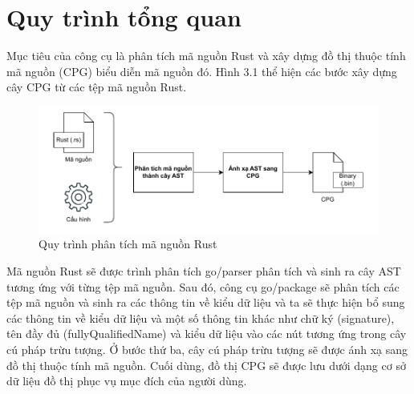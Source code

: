 \section{Quy trình tổng quan}

Mục tiêu của công cụ là phân tích mã nguồn Rust và xây dựng đồ thị thuộc tính mã
nguồn (CPG) biểu diễn mã nguồn đó. Hình 3.1 thể hiện các bước xây dựng cây CPG từ
các tệp mã nguồn Rust.

\begin{figure}[H]
	\includegraphics[width=1\columnwidth]{figures/c3/c3_flow.drawio.pdf}
	\centering
	\caption{Quy trình phân tích mã nguồn Rust}
	\label{img:method_flow}
\end{figure}

Mã nguồn Rust sẽ được trình phân tích go/parser phân tích và sinh ra cây AST tương
ứng với từng tệp mã nguồn. Sau đó, công cụ go/package sẽ phân tích các tệp mã nguồn
và sinh ra các thông tin về kiểu dữ liệu và ta sẽ thực hiện bổ sung các thông tin về kiểu dữ
liệu và một số thông tin khác như chữ ký (signature), tên đầy đủ (fullyQualifiedName) và kiểu dữ liệu vào các nút tương ứng trong cây cú pháp trừu tượng. Ở bước thứ ba, cây
cú pháp trừu tượng sẽ được ánh xạ sang đồ thị thuộc tính mã nguồn. Cuối dùng, đồ thị
CPG sẽ được lưu dưới dạng cơ sở dữ liệu đồ thị phục vụ mục đích của người dùng.